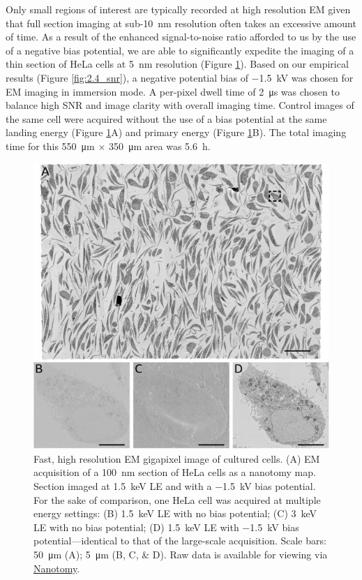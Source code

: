 Only small regions of interest are typically recorded at high resolution EM given that full section imaging at sub-\SI{10}{\nano\meter} resolution often takes an excessive amount of time. As a result of the enhanced signal-to-noise ratio afforded to us by the use of a negative bias potential, we are able to significantly expedite the imaging of a thin section of HeLa cells at \SI{5}{\nano\meter} resolution (Figure \ref{fig:2.6_cells}). Based on our empirical results (Figure \ref{fig:2.4_snr}), a negative potential bias of \SI{-1.5}{\kilo\volt} was chosen for EM imaging in immersion mode. A per-pixel dwell time of \SI{2}{\micro\second} was chosen to balance high SNR and image clarity with overall imaging time. Control images of the same cell were acquired without the use of a bias potential at the same landing energy (Figure \ref{fig:2.6_cells}A) and primary energy (Figure \ref{fig:2.6_cells}B). The total imaging time for this \SI{550}{\micro\meter} $\times$ \SI{350}{\micro\meter} area was \SI{5.6}{\hour}.

\begin{figure}[!tbh]
    \centering
    \includegraphics[width=\linewidth]{chapter-2/figures_JPEG_LQ/fig2-6_cells.jpg}
    \caption{Fast, high resolution EM gigapixel image of cultured cells. (A) EM acquisition of a \SI{100}{\nano\meter} section of HeLa cells as a nanotomy map. Section imaged at \SI{1.5}{\kilo\electronvolt} LE and with a \SI{-1.5}{\kilo\volt} bias potential. For the sake of comparison, one HeLa cell was acquired at multiple energy settings: (B) \SI{1.5}{\kilo\electronvolt} LE with no bias potential; (C) \SI{3}{\kilo\electronvolt} LE with no bias potential; (D) \SI{1.5}{\kilo\electronvolt} LE with \SI{-1.5}{\kilo\volt} bias potential—identical to that of the large-scale acquisition. Scale bars: \SI{50}{\micro\meter} (A); \SI{5}{\micro\meter} (B, C, \& D). Raw data is available for viewing via \href{www.nanotomy.org}{Nanotomy}.}
    \label{fig:2.6_cells}
\end{figure}

